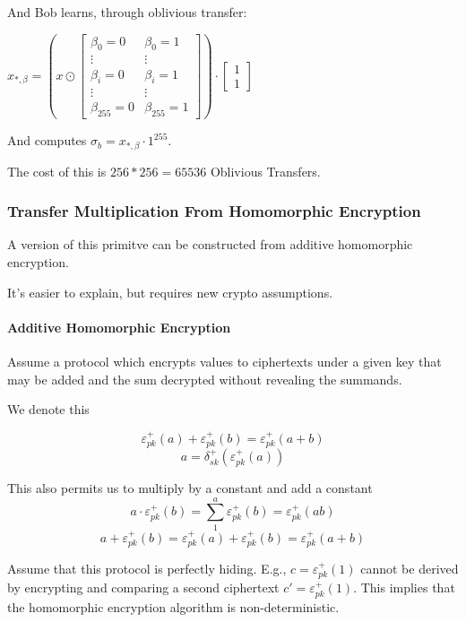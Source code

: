 \documentclass{article}
\newcommand{\addencrypt}{\varepsilon^{+}}
\newcommand{\adddecrypt}{\delta^{+}}
\begin{document}
And Bob learns, through oblivious transfer:

$x_{*, \beta} = \left(x \odot \begin{bmatrix}
\beta_0 = 0 & \beta_0 = 1 \\
\vdots & \vdots \\
\beta_i = 0 & \beta_i = 1 \\
\vdots & \vdots \\
\beta_{255} = 0 & \beta_{255} = 1
\end{bmatrix}\right) \cdot \begin{bmatrix}
1\\ 1
\end{bmatrix}
$

And computes $\sigma_b = x_{*,\beta} \cdot 1^{255}$.

The cost of this is $256*256 = 65536$ Oblivious Transfers.

\subsubsection{Transfer Multiplication From Homomorphic Encryption}

A version of this primitve can be constructed from additive homomorphic encryption. 

It's easier to explain, but requires new crypto assumptions.
\paragraph{Additive Homomorphic Encryption}

Assume a protocol which encrypts values to ciphertexts under a given key that may be added
and the sum decrypted without revealing the summands.

We denote this

$$\addencrypt_{pk}(a) + \addencrypt_{pk}(b) = \addencrypt_{pk}(a+b)$$
$$ a = \adddecrypt_{sk}(\addencrypt_{pk}(a)) $$

This also permits us to  multiply by a constant and add a constant
$$a\cdot\addencrypt_{pk}(b) = \sum_1^a  \addencrypt_{pk}(b) = \addencrypt_{pk}(ab)$$
$$a + \addencrypt_{pk}(b) = \addencrypt_{pk}(a) + \addencrypt_{pk}(b) = \addencrypt_{pk}(a+b)$$

Assume that this protocol is perfectly hiding. E.g., $c = \addencrypt_{pk}(1)$ 
cannot be derived by encrypting and comparing a second ciphertext $c' = \addencrypt_{pk}(1)$.
This implies that the homomorphic encryption algorithm is non-deterministic.
\end{document}
